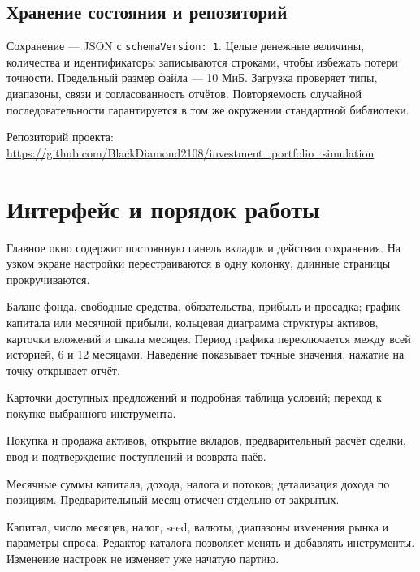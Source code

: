 \documentclass[11pt,a4paper]{article}
\newcommand{\code}[1]{\texttt{#1}}
\begin{document}
\subsection*{Хранение состояния и репозиторий}
Сохранение --- JSON с \code{schemaVersion: 1}. Целые денежные величины, количества и идентификаторы записываются строками, чтобы избежать потери точности. Предельный размер файла --- 10 МиБ. Загрузка проверяет типы, диапазоны, связи и согласованность отчётов. Повторяемость случайной последовательности гарантируется в том же окружении стандартной библиотеки.

Репозиторий проекта:\\
\url{https://github.com/BlackDiamond2108/investment_portfolio_simulation}

\newpage
\section{Интерфейс и порядок работы}
Главное окно содержит постоянную панель вкладок и действия сохранения. На узком экране настройки перестраиваются в одну колонку, длинные страницы прокручиваются.

\begin{description}[style=nextline]
\item[Обзор] Баланс фонда, свободные средства, обязательства, прибыль и просадка; график капитала или месячной прибыли, кольцевая диаграмма структуры активов, карточки вложений и шкала месяцев. Период графика переключается между всей историей, 6 и 12 месяцами. Наведение показывает точные значения, нажатие на точку открывает отчёт.
\item[Рынок] Карточки доступных предложений и подробная таблица условий; переход к покупке выбранного инструмента.
\item[Операции] Покупка и продажа активов, открытие вкладов, предварительный расчёт сделки, ввод и подтверждение поступлений и возврата паёв.
\item[История и итоги] Месячные суммы капитала, дохода, налога и потоков; детализация дохода по позициям. Предварительный месяц отмечен отдельно от закрытых.
\item[Новая игра] Капитал, число месяцев, налог, seed, валюты, диапазоны изменения рынка и параметры спроса. Редактор каталога позволяет менять и добавлять инструменты. Изменение настроек не изменяет уже начатую партию.
\end{description}
\end{document}
